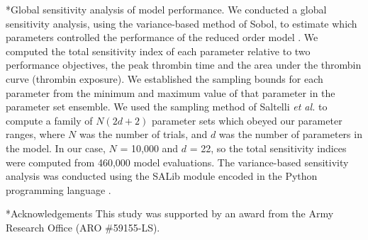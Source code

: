 \documentclass[12pt]{article}
\makeatletter
\renewcommand\subsection{\@startsection
	{subsection}{2}{0mm}
	{-0.05in}
	{-0.5\baselineskip}
	{\normalfont\normalsize\bfseries}}
\renewcommand\section{\@startsection
	{subsection}{2}{0mm}
	{-0.2in}
	{0.05\baselineskip}
	{\normalfont\large\bfseries}}
\makeatother
\begin{document}
\subsection*{Global sensitivity analysis of model performance.}
We conducted a global sensitivity analysis, using the variance-based method of Sobol, to estimate which parameters controlled the performance of the reduced order model \citep{SOBOL_METHOD}. 
We computed the total sensitivity index of each parameter relative to two performance objectives, the peak thrombin time and the area under the thrombin curve (thrombin exposure).
We established the sampling bounds for each parameter from the minimum and maximum value of that parameter in the parameter set ensemble. 
We used the sampling method of Saltelli \textit{et al.} \citep{Saltelli:2010} to compute a family of $N\left(2d+2\right)$ parameter sets which obeyed our parameter ranges, 
where $N$ was the number of trials, and $d$ was the number of parameters in the model. In our case, $N$ = 10,000 and $d$ = 22, so the total sensitivity indices were computed from
460,000 model evaluations. The variance-based sensitivity analysis was conducted using the SALib module encoded in the Python programming language \citep{SALIB}.

\section*{Acknowledgements}
This study was supported by an award from the Army Research Office (ARO \#59155-LS).

\clearpage
%
%




\clearpage
\end{document}
